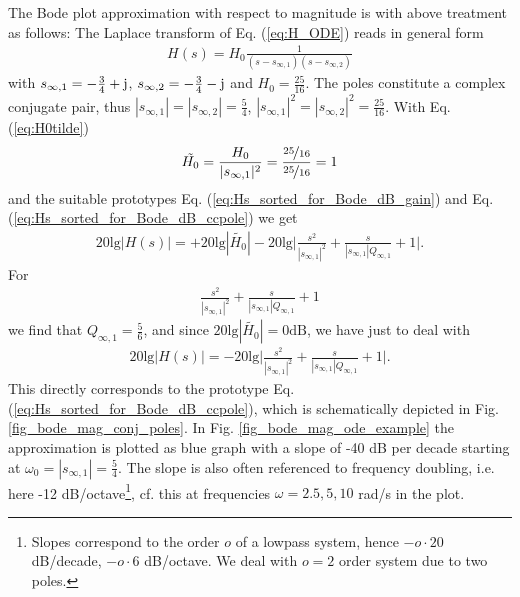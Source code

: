 \documentclass[a4paper,11pt,oneside]{scrartcl}
\newcommand{\eq}[1]{Eq. (\ref{#1})}
\begin{document}
The Bode plot approximation with respect to magnitude is with above treatment as follows: The Laplace transform of \eq{eq:H_ODE} reads in general form
\begin{align}
H(s) = H_0 \frac{1}{(s-s_{\infty,1}) (s-s_{\infty,2})}
\end{align}
with $s_{\infty,1} = -\frac{3}{4}+\im$, $s_{\infty,2} = -\frac{3}{4}-\im$ and $H_0 = \frac{25}{16}$.
%
The poles constitute a complex conjugate pair, thus
$|s_{\infty,1}| = |s_{\infty,2}| = \frac{5}{4}$, $|s_{\infty,1}|^2 = |s_{\infty,2}|^2 = \frac{25}{16}$.
%
With \eq{eq:H0tilde}
\begin{align}
\tilde{H_0} = \frac{H_0}{|s_{\infty,1}|^2} = \frac{\nicefrac{25}{16}}{\nicefrac{25}{16}} = 1
\end{align}
and the suitable prototypes \eq{eq:Hs_sorted_for_Bode_dB_gain} and \eq{eq:Hs_sorted_for_Bode_dB_ccpole}
we get
\begin{align}
20 \text{lg} |H(s)| =
+20 \text{lg} |\tilde{H_0}|
-20 \text{lg} \bigg|\frac{s^2}{|s_{\infty,1}|^2} + \frac{s}{|s_{\infty,1}| Q_{\infty,1}} + 1\bigg|.
\end{align}
For
\begin{align}
\frac{s^2}{|s_{\infty,1}|^2} + \frac{s}{|s_{\infty,1}| Q_{\infty,1}} + 1
\end{align}
we find that $Q_{\infty,1}=\frac{5}{6}$, and since $20 \text{lg} |\tilde{H_0}|=0\mathrm{dB}$, we have just to deal with
\begin{align}
20 \text{lg} |H(s)| =
-20 \text{lg} \bigg|\frac{s^2}{|s_{\infty,1}|^2} + \frac{s}{|s_{\infty,1}| Q_{\infty,1}} + 1\bigg|.
\end{align}
This directly corresponds to the prototype \eq{eq:Hs_sorted_for_Bode_dB_ccpole}, which
is schematically depicted in Fig. \ref{fig_bode_mag_conj_poles}.
%
In Fig. \ref{fig_bode_mag_ode_example} the approximation is plotted as blue graph with a slope of -40 dB per decade starting at $\omega_0 = |s_{\infty,1}|=\frac{5}{4}$.
The slope is also often referenced to frequency doubling, i.e. here -12 dB/octave\footnote{Slopes correspond to the order $o$ of a lowpass system, hence $-o\cdot 20$ dB/decade, $-o\cdot 6$ dB/octave. We deal with $o=2$ order system due to two poles.}, cf. this at frequencies $\omega=2.5, 5, 10$ rad/s in the plot.
\end{document}
